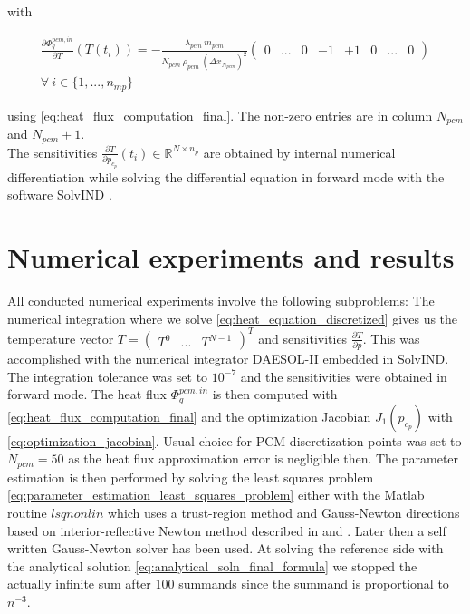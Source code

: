 \documentclass{scrartcl}[12pt, halfparskip]
\numberwithin{equation}{section}
\numberwithin{figure}{section}
\numberwithin{table}{section}
\begin{document}
with

\begin{align}
	\frac{\partial \varPhi_{q}^{pcm,in}}{\partial T}(T(t_i)) = - \frac{\lambda_{pcm} \ m_{pcm}}{N_{pcm} \ \rho_{pcm} \ (\Delta x_{N_{pcm}})^2}
	\begin{pmatrix}
	0 & ... & 0 & -1 & +1 & 0 & ... & 0
	\end{pmatrix}\\
	\forall \ i \in \{1,...,n_{mp} \} \nonumber
\end{align}

using \cref{eq:heat_flux_computation_final}. The non-zero entries are in column $N_{pcm}$ and $N_{pcm}+1$. \\
The sensitivities $\frac{\partial T}{\partial p_{c_p}}(t_i) \in \mathbb{R}^{N \times n_p}$ are obtained by internal numerical differentiation while solving the differential equation in forward mode with the software SolvIND \cite{diss_jan}. \\




\section{Numerical experiments and results}
All conducted numerical experiments involve the following subproblems: The numerical integration where we solve \cref{eq:heat_equation_discretized} gives us the temperature vector $T = \begin{pmatrix} T^0 & ... & T^{N-1}  \end{pmatrix}^T$ and sensitivities $\frac{\partial T}{\partial p}$. This was accomplished with the numerical integrator DAESOL-II embedded in SolvIND. The integration tolerance was set to $10^{-7}$ and the sensitivities were obtained in forward mode.
The heat flux $\varPhi_q^{pcm,in}$ is then computed with \cref{eq:heat_flux_computation_final} and the optimization Jacobian $J_1(p_{c_p})$ with \cref{eq:optimization_jacobian}. Usual choice for PCM discretization points was set to $N_{pcm}=50$ as the heat flux approximation error is negligible then. The parameter estimation is then performed by solving the least squares problem \cref{eq:parameter_estimation_least_squares_problem} either with the Matlab routine $lsqnonlin$ which uses a trust-region method and Gauss-Newton directions based on interior-reflective Newton method described in \cite{lsqnonlin_alg1} and \cite{lsqnonlin_alg2}. Later then a self written Gauss-Newton solver has been used.
At solving the reference side with the analytical solution \cref{eq:analytical_soln_final_formula} we stopped the actually infinite sum after 100 summands since the summand is proportional to $n^{-3}$. \\
\end{document}
